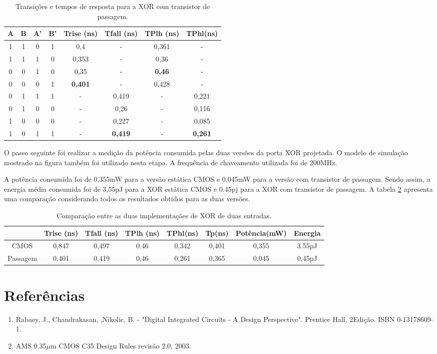 \documentclass[a4paper,10pt] {article}
\begin{document}
\begin{table} [h]
  \centering
  \caption{Transições e tempos de resposta para a XOR com transistor de passagem.}
  \begin{tabular}{c|c|c|c|c|c|c|c}
    \hline
    A & B & A' & B' & Trise (ns) & Tfall (ns) & TPlh (ns) & TPhl(ns) \\ \hline
    1 & 1 & 0 &  1  & 0,4 & - & 0,361 & - \\ \hline
    1 & 1 & 1 &  0  & 0,353 & - & 0,36 & - \\ \hline
    0 & 0 & 1 &  0  & 0,35 & - & \bf{0,46} & - \\ \hline
    0 & 0 & 0 &  1  & \bf{0,401} & - & 0,428 & - \\ \hline
    0 & 1 & 1 &  1  & - & 0,419 & - & 0,221 \\ \hline
    0 & 1 & 0 &  0  & - & 0,26 & - & 0,116 \\ \hline
    1 & 0 & 0 &  0  & - & 0,227 & - & 0,085 \\ \hline
    1 & 0 & 1 &  1  & - & \bf{0,419} & - & \bf{0,261} \\ \hline
  \end{tabular}
  \label{tab:table2}
\end{table}


O passo seguinte foi realizar a medição da potência consumida pelas duas versões da porta XOR projetada.
O modelo de simulação mostrado na figura  também foi utilizado nesta etapa. A frequência de chaveamento utilizada foi de 200MHz.



A potência consumida foi de 0,355mW para a versão estática CMOS e 0,045mW para a versão com transistor de passagem. Sendo assim, a energia média consumida foi de 3,55pJ para a XOR estática
CMOS e 0.45pj para a XOR com transistor de passagem. A tabela \ref{tab:table3} apresenta uma comparação considerando todos os resultados obtidos para as duas versões.

\begin{table} [h]
  \centering
  \caption{Comparação entre as duas implementações de XOR de duas entradas.}
  \begin{tabular}{c|c|c|c|c|c|c|c}
    \hline
		& Trise (ns)	& Tfall (ns)	& TPlh (ns)	& TPhl(ns)	& Tp(ns)	& Potência(mW)	& Energia \\ \hline
    CMOS	& 0,847 	& 0,497		& 0.46		& 0,342		& 0,401		& 0,355		& 3.55pJ  \\ \hline
    Passagem	& 0,401		& 0,419		& 0,46		& 0,261		& 0,365		& 0,045		& 0,45pJ  \\ \hline
  \end{tabular}
  \label{tab:table3}
\end{table}

\section{Referências}
\begin{enumerate}
\item Rabaey, J., Chandrakasan, \textordfeminine,Nikolic, B. - "Digital Integrated Circuits - A Design Perspective". Prentice Hall, 2\textordfeminine Edição. ISBN 0-13178609-1.
\item AMS 0.35$\mu$m CMOS C35 Design Rules revisão 2.0, 2003.
\end{enumerate}
\end{document}
